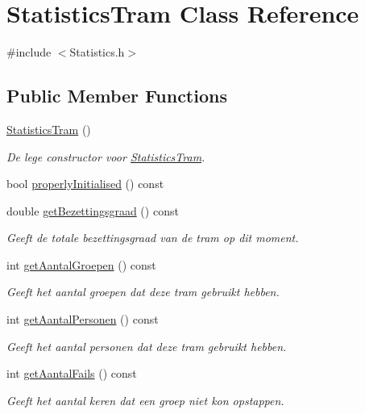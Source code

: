 \hypertarget{class_statistics_tram}{}\section{Statistics\+Tram Class Reference}
\label{class_statistics_tram}


{\ttfamily \#include $<$Statistics.\+h$>$}

\subsection*{Public Member Functions}
\begin{DoxyCompactItemize}
\item 
\hyperlink{class_statistics_tram_a6c282003872f15fecc06c1f6f1d8e3a5}{Statistics\+Tram} ()
\begin{DoxyCompactList}\small\item\em De lege constructor voor \hyperlink{class_statistics_tram}{Statistics\+Tram}. \end{DoxyCompactList}\item 
bool \hyperlink{class_statistics_tram_a5625bdbfc18789e245abeea13812536b}{properly\+Initialised} () const 
\item 
double \hyperlink{class_statistics_tram_a6c3374680be8a1afdd5cd5cca3cff88f}{get\+Bezettingsgraad} () const 
\begin{DoxyCompactList}\small\item\em Geeft de totale bezettingsgraad van de tram op dit moment. \end{DoxyCompactList}\item 
int \hyperlink{class_statistics_tram_a07ed61ed842d741d5a37473b087ce342}{get\+Aantal\+Groepen} () const 
\begin{DoxyCompactList}\small\item\em Geeft het aantal groepen dat deze tram gebruikt hebben. \end{DoxyCompactList}\item 
int \hyperlink{class_statistics_tram_a9bd109c35a5475eb58ef83296f206674}{get\+Aantal\+Personen} () const 
\begin{DoxyCompactList}\small\item\em Geeft het aantal personen dat deze tram gebruikt hebben. \end{DoxyCompactList}\item 
int \hyperlink{class_statistics_tram_af7cb54424f755c8a52174b3912c5a690}{get\+Aantal\+Fails} () const 
\begin{DoxyCompactList}\small\item\em Geeft het aantal keren dat een groep niet kon opstappen. \end{DoxyCompactList}\item 

\end{DoxyCompactItemize}
